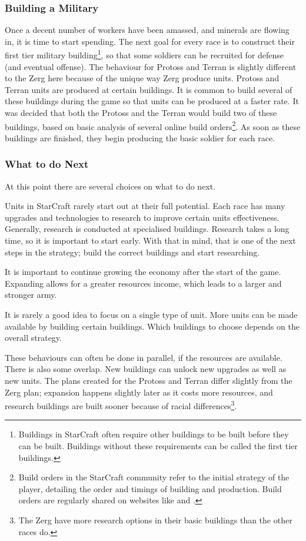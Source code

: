 \documentclass[11pt,openright,a4paper]{report}
\begin{document}
\subsubsection{Building a Military}
Once a decent number of workers have been amassed, and minerals are flowing in, it is time to start spending. The next goal for every race is to construct their first tier military building\footnote{Buildings in StarCraft often require other buildings to be built before they can be built. Buildings without these requirements can be called the first tier buildings.}, so that some soldiers can be recruited for defense (and eventual offense). The behaviour for Protoss and Terran is slightly different to the Zerg here because of the unique way Zerg produce units. Protoss and Terran units are produced at certain buildings. It is common to build several of these buildings during the game so that units can be produced at a faster rate. It was decided that both the Protoss and the Terran would build two of these buildings, based on basic analysis of several online build orders\footnote{Build orders in the StarCraft community refer to the initial strategy of the player, detailing the order and timings of building and production. Build orders are regularly shared on websites like  and .}. As soon as these buildings are finished, they begin producing the basic soldier for each race.

\subsubsection{What to do Next}
At this point there are several choices on what to do next.
\begin{description}[leftmargin=1.5cm,labelindent=1cm]
\item[Research upgrades]{Units in StarCraft rarely start out at their full potential. Each race has many upgrades and technologies to research to improve certain units effectiveness. Generally, research is conducted at specialised buildings. Research takes a long time, so it is important to start early. With that in mind, that is one of the next steps in the strategy; build the correct buildings and start researching.}
\item[Expand to new bases]{It is important to continue growing the economy after the start of the game. Expanding allows for a greater resources income, which leads to a larger and stronger army.}
\item[Produce different units]{It is rarely a good idea to focus on a single type of unit. More units can be made available by building certain buildings. Which buildings to choose depends on the overall strategy.}
\end{description}
These behaviours can often be done in parallel, if the resources are available. There is also some overlap. New buildings can unlock new upgrades as well as new units. The plans created for the Protoss and Terran differ slightly from the Zerg plan; expansion happens slightly later as it costs more resources, and research buildings are built sooner because of racial differences\footnote{The Zerg have more research options in their basic buildings than the other races do.}.
\end{document}
